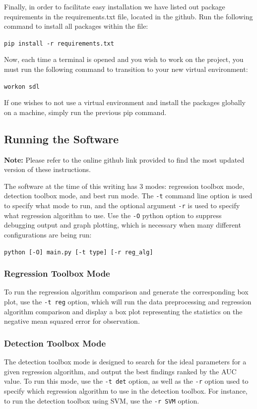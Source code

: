 \documentclass{acm_proc_article-sp}
\begin{document}
Finally, in order to facilitate easy installation we have listed out package requirements in the requirements.txt file, located in the github. Run the following command to install all packages within the file:

\verb|pip install -r requirements.txt|

Now, each time a terminal is opened and you wish to work on the project, you must run the following command to transition to your new virtual environment: 

\verb|workon sdl|

If one wishes to not use a virtual environment and install the packages globally on a machine, simply run the previous pip command. 

\subsection{Running the Software}

\textbf{Note:} Please refer to the online github link provided to find the most updated version of these instructions.

The software at the time of this writing has 3 modes: regression toolbox mode, detection toolbox mode, and best run mode. The \verb|-t| command line option is used to specify what mode to run, and the optional argument \verb|-r| is used to specify what regression algorithm to use. Use the \verb|-O| python option to suppress debugging output and graph plotting, which is necessary when many different configurations are being run:

\verb|python [-O] main.py [-t type] [-r reg_alg]|

\subsubsection{Regression Toolbox Mode}
To run the regression algorithm comparison and generate the corresponding box plot, use the \verb|-t reg| option, which will run the data preprocessing and regression algorithm comparison and display a box plot representing the statistics on the negative mean squared error for observation.

\subsubsection{Detection Toolbox Mode}
The detection toolbox mode is designed to search for the ideal parameters for a given regression algorithm, and output the best findings ranked by the AUC value. To run this mode, use the \verb|-t det| option, as well as the \verb|-r| option used to specify which regression algorithm to use in the detection toolbox. For instance, to run the detection toolbox using SVM, use the \verb|-r SVM| option.
\end{document}
